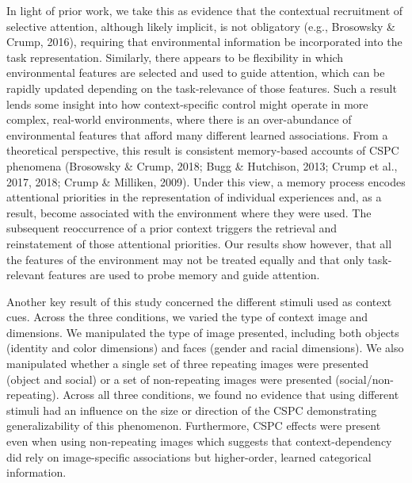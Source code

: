 \documentclass[english,,man,floatsintext]{apa6}
\begin{document}
In light of prior work, we take this as evidence that the contextual recruitment of selective attention, although likely implicit, is not obligatory (e.g., Brosowsky \& Crump, 2016), requiring that environmental information be incorporated into the task representation. Similarly, there appears to be flexibility in which environmental features are selected and used to guide attention, which can be rapidly updated depending on the task-relevance of those features. Such a result lends some insight into how context-specific control might operate in more complex, real-world environments, where there is an over-abundance of environmental features that afford many different learned associations. From a theoretical perspective, this result is consistent memory-based accounts of CSPC phenomena (Brosowsky \& Crump, 2018; Bugg \& Hutchison, 2013; Crump et al., 2017, 2018; Crump \& Milliken, 2009). Under this view, a memory process encodes attentional priorities in the representation of individual experiences and, as a result, become associated with the environment where they were used. The subsequent reoccurrence of a prior context triggers the retrieval and reinstatement of those attentional priorities. Our results show however, that all the features of the environment may not be treated equally and that only task-relevant features are used to probe memory and guide attention.

Another key result of this study concerned the different stimuli used as context cues. Across the three conditions, we varied the type of context image and dimensions. We manipulated the type of image presented, including both objects (identity and color dimensions) and faces (gender and racial dimensions). We also manipulated whether a single set of three repeating images were presented (object and social) or a set of non-repeating images were presented (social/non-repeating). Across all three conditions, we found no evidence that using different stimuli had an influence on the size or direction of the CSPC demonstrating generalizability of this phenomenon. Furthermore, CSPC effects were present even when using non-repeating images which suggests that context-dependency did rely on image-specific associations but higher-order, learned categorical information.
\end{document}
